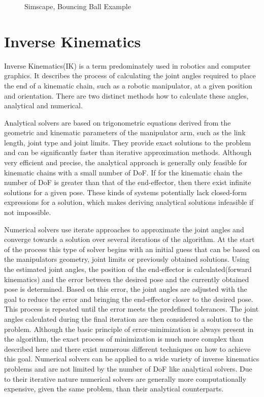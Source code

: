 \begin{figure}
	\centerline{}
	\caption{Simscape, Bouncing Ball Example}
	\label{Simscape Bouncing Ball Example}
\end{figure}

\section{Inverse Kinematics}
Inverse Kinematics(IK) is a term predominately used in robotics and computer graphics.
It describes the process of calculating the joint angles required to place the end of a kinematic chain, such as a robotic manipulator, at a given position and orientation.
There are two distinct methods how to calculate these angles, analytical and numerical.

Analytical solvers are based on trigonometric equations derived from the geometric and kinematic parameters of the manipulator arm, such as the link length, joint type and joint limits.
They provide exact solutions to the problem and can be significantly faster than iterative approximation methods.
Although very efficient and precise, the analytical approach is generally only feasible for kinematic chains with a small number of DoF.
If for the kinematic chain the number of DoF is greater than that of the end-effector, then there exist infinite solutions for a given pose.
These kinds of systems potentially lack closed-form expressions for a solution, which makes deriving analytical solutions infeasible if not impossible.


Numerical solvers use iterate approaches to approximate the joint angles and converge towards a solution over several iterations of the algorithm.
At the start of the process this type of solver begins with an initial guess that can be based on the manipulators geometry, joint limits or previously obtained solutions.
Using the estimated joint angles, the position of the end-effector is calculated(forward kinematics) and the error between the desired pose and the currently obtained pose is determined.
Based on this error, the joint angles are adjusted with the goal to reduce the error and bringing the end-effector closer to the desired pose.
This process is repeated until the error meets the predefined tolerances.
The joint angles calculated during the final iteration are then considered a solution to the problem.
Although the basic principle of error-minimization is always present in the algorithm, the exact process of minimization is much more complex than described here and there exist numerous different techniques on how to achieve this goal.
Numerical solvers can be applied to a wide variety of inverse kinematics problems and are not limited by the number of DoF like analytical solvers.
Due to their iterative nature numerical solvers are generally more computationally expensive, given the same problem, than their analytical counterparts.

